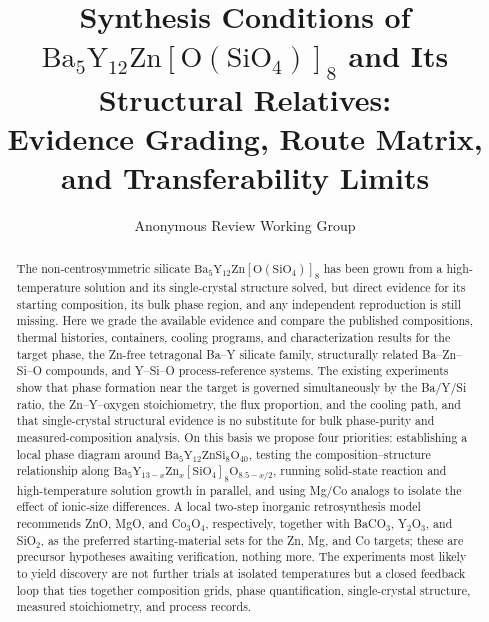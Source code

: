 \documentclass[10pt]{article}
\title{Synthesis Conditions of $\mathrm{Ba_5Y_{12}Zn[O(SiO_4)]_8}$ and Its Structural Relatives:\\
Evidence Grading, Route Matrix, and Transferability Limits}
\author{Anonymous Review Working Group}
\date{}
\begin{document}
\maketitle

\begin{abstract}
The non-centrosymmetric silicate $\mathrm{Ba_5Y_{12}Zn[O(SiO_4)]_8}$ has been grown from a high-temperature solution and its single-crystal structure solved, but direct evidence for its starting composition, its bulk phase region, and any independent reproduction is still missing. Here we grade the available evidence and compare the published compositions, thermal histories, containers, cooling programs, and characterization results for the target phase, the Zn-free tetragonal Ba--Y silicate family, structurally related Ba--Zn--Si--O compounds, and Y--Si--O process-reference systems. The existing experiments show that phase formation near the target is governed simultaneously by the Ba/Y/Si ratio, the Zn--Y--oxygen stoichiometry, the flux proportion, and the cooling path, and that single-crystal structural evidence is no substitute for bulk phase-purity and measured-composition analysis. On this basis we propose four priorities: establishing a local phase diagram around $\mathrm{Ba_5Y_{12}ZnSi_8O_{40}}$, testing the composition--structure relationship along $\mathrm{Ba_5Y_{13-\mathit{x}}Zn_{\mathit{x}}[SiO_4]_8O_{8.5-\mathit{x}/2}}$, running solid-state reaction and high-temperature solution growth in parallel, and using Mg/Co analogs to isolate the effect of ionic-size differences. A local two-step inorganic retrosynthesis model recommends ZnO, MgO, and Co$_3$O$_4$, respectively, together with BaCO$_3$, Y$_2$O$_3$, and SiO$_2$, as the preferred starting-material sets for the Zn, Mg, and Co targets; these are precursor hypotheses awaiting verification, nothing more. The experiments most likely to yield discovery are not further trials at isolated temperatures but a closed feedback loop that ties together composition grids, phase quantification, single-crystal structure, measured stoichiometry, and process records.
\end{abstract}















\end{document}
